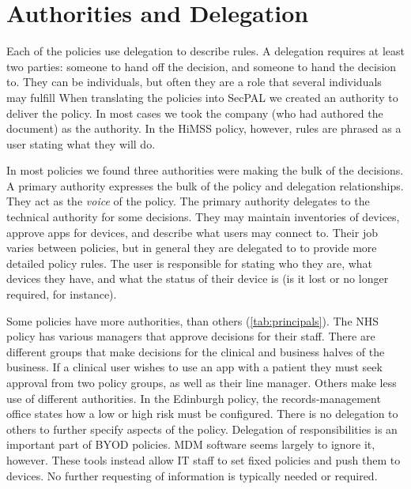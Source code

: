 \documentclass[conference,twocolumn]{IEEEtran}
\begin{document}
\section{Authorities and Delegation}

Each of the policies use delegation to describe rules.
A delegation requires at least two parties: someone to hand off the decision, and someone to hand the decision to.
They can be individuals, but often they are a role that several individuals may fulfill
When translating the policies into SecPAL we created an authority to deliver the policy.
In most cases we took the company (who had authored the document) as the authority. 
In the HiMSS policy, however, rules are phrased as a user stating what they will do.

In most policies we found three authorities were making the bulk of the decisions.
A primary authority expresses the bulk of the policy and delegation relationships.
They act as the \emph{voice} of the policy.
The primary authority delegates to the technical authority for some decisions.
They may maintain inventories of devices, approve apps for devices, and describe what users may connect to.
Their job varies between policies, but in general they are delegated to to provide more detailed policy rules.
The user is responsible for stating who they are, what devices they have, and what the status of their device is (is it lost or no longer required, for instance).

Some policies have more authorities, than others (\autoref{tab:principals}).
The NHS policy has various managers that approve decisions for their staff.
There are different groups that make decisions for the clinical and business halves of the business.
If a clinical user wishes to use an app with a patient they must seek approval from two policy groups, as well as their line manager.
Others make less use of different authorities. 
In the Edinburgh policy, the records-management office states how a low or high risk must be configured.
There is no delegation to others to further specify aspects of the policy.
Delegation of responsibilities is an important part of BYOD policies.
MDM software seems largely to ignore it, however. 
These tools instead allow IT staff to set fixed policies and push them to devices.
No further requesting of information is typically needed or required.
\end{document}

